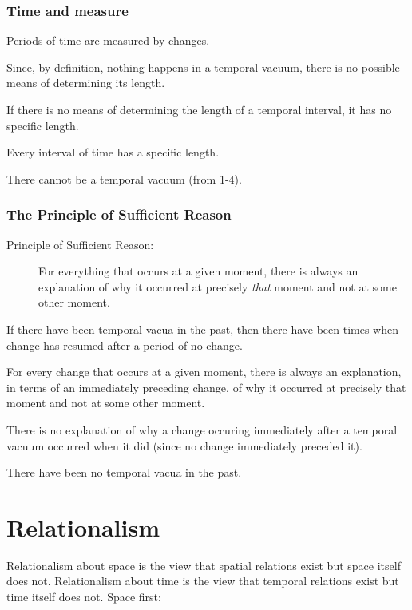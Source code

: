 \documentclass[oneside]{article}
\begin{document}
\subsubsection*{Time and measure}
\begin{enumerate*}
\item Periods of time are measured by changes. 
\item Since, by definition, nothing happens in a temporal vacuum, there is no possible means of determining its length. 
\item If there is no means of determining the length of a temporal interval, it has no specific length. 
\item Every interval of time has a specific length. 
\item There cannot be a temporal vacuum (from 1-4). 

\end{enumerate*}


\subsubsection*{The Principle of Sufficient Reason}
\begin{description}
\item[Principle of Sufficient Reason:] For everything that occurs at a given moment, there is always an explanation of why it occurred at precisely \emph{that} moment and not at some other moment.
\end{description} 

\begin{enumerate*}
\item If there have been temporal vacua in the past, then there have been times when change has resumed after a period of no change. 
\item For every change that occurs at a given moment, there is always an explanation, in terms of an immediately preceding change, of why it occurred at precisely that moment and not at some other moment. 
\item There is no explanation of why a change occuring immediately after a temporal vacuum occurred when it did (since no change immediately preceded it). 
\item There have been no temporal vacua in the past. 
\end{enumerate*}


\section*{Relationalism}
Relationalism about space is the view that spatial relations exist but space itself
does not. Relationalism about time is the view that temporal relations exist but time itself does not. Space first: 
\end{document}
